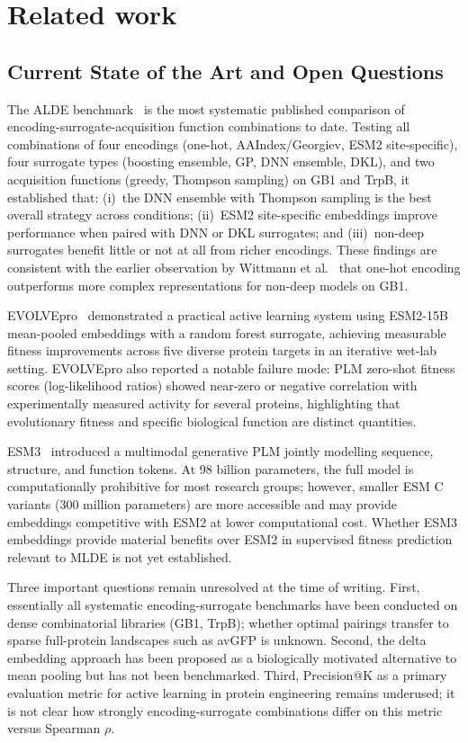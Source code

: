 \section{Related work}
\subsection{Current State of the Art and Open Questions}
\label{sec:litrev:sota}

The ALDE benchmark~\cite{yangActiveLearningAssistedDirected} is the most systematic published comparison of
encoding-surrogate-acquisition function combinations to date.
Testing all combinations of four encodings (one-hot, AAIndex/Georgiev, ESM2 site-specific),
four surrogate types (boosting ensemble, GP, DNN ensemble, DKL), and two acquisition functions
(greedy, Thompson sampling) on GB1 and TrpB, it established that:
(i)\ the DNN ensemble with Thompson sampling is the best overall strategy across conditions;
(ii)\ ESM2 site-specific embeddings improve performance when paired with DNN or DKL surrogates;
and (iii)\ non-deep surrogates benefit little or not at all from richer encodings.
These findings are consistent with the earlier observation by Wittmann et al.~\cite{wittmannInformedTrainingSet2021}
that one-hot encoding outperforms more complex representations for non-deep models on GB1.

EVOLVEpro~\cite{jiangRapidProteinEvolution2024} demonstrated a practical active learning system using
ESM2-15B mean-pooled embeddings with a random forest surrogate, achieving measurable fitness
improvements across five diverse protein targets in an iterative wet-lab setting.
EVOLVEpro also reported a notable failure mode: PLM zero-shot fitness scores (log-likelihood
ratios) showed near-zero or negative correlation with experimentally measured activity for
several proteins, highlighting that evolutionary fitness and specific biological function are
distinct quantities.

ESM3~\cite{hayesSimulating500Million} introduced a multimodal generative PLM jointly modelling sequence,
structure, and function tokens.
At 98 billion parameters, the full model is computationally prohibitive for most research
groups; however, smaller ESM C variants (300 million parameters) are more accessible and may
provide embeddings competitive with ESM2 at lower computational cost.
Whether ESM3 embeddings provide material benefits over ESM2 in supervised fitness prediction
relevant to MLDE is not yet established.

Three important questions remain unresolved at the time of writing.
First, essentially all systematic encoding-surrogate benchmarks have been conducted on dense
combinatorial libraries (GB1, TrpB); whether optimal pairings transfer to sparse full-protein
landscapes such as avGFP is unknown.
Second, the delta embedding approach has been proposed as a biologically motivated alternative
to mean pooling but has not been benchmarked.
Third, Precision@K as a primary evaluation metric for active learning in protein engineering
remains underused; it is not clear how strongly encoding-surrogate combinations differ on
this metric versus Spearman $\rho$.
